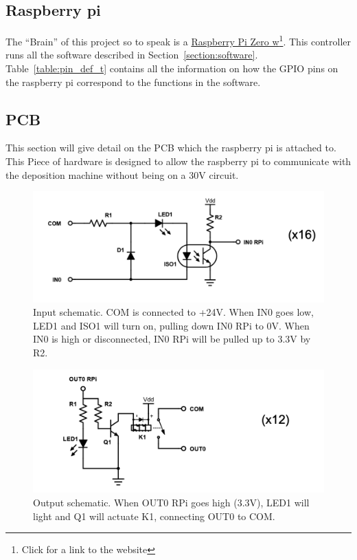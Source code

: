 \documentclass{article}
\begin{document}
\subsection{Raspberry pi}
\label{section:raspi}
The ``Brain'' of this project so to speak is a \href{https://www.raspberrypi.org/products/raspberry-pi-zero-w/}{ Raspberry Pi Zero w}\footnote{Click for a link to the website}. This controller runs all the software described in Section~\ref{section:software}. Table~\ref{table:pin_def_t} contains all the information on how the GPIO pins on the raspberry pi correspond to the functions in the software.

\subsection{PCB}
This section will give detail on the PCB which the raspberry pi is attached to. This Piece of hardware is designed to allow the raspberry pi to communicate with the deposition machine without being on a 30V circuit.
\begin{center}
    \begin{figure}[h!]
      \includegraphics[scale=.8]{inputschem.png}
      \caption{Input schematic. COM is connected to +24V. When IN0 goes low, LED1 and ISO1 will turn on, pulling down IN0 RPi to 0V. When IN0 is high or disconnected, IN0 RPi will be pulled up to 3.3V by R2.}
      \label{fig:input_schem}
    \end{figure}
\end{center}



\begin{center}
    \begin{figure}[h!]
      \includegraphics[scale=.9]{outputschem.png}
      \caption{Output schematic. When OUT0 RPi goes high (3.3V), LED1 will light and Q1 will actuate K1, connecting OUT0 to COM.}
      \label{fig:output_schem}
    \end{figure}
\end{center}
\end{document}
